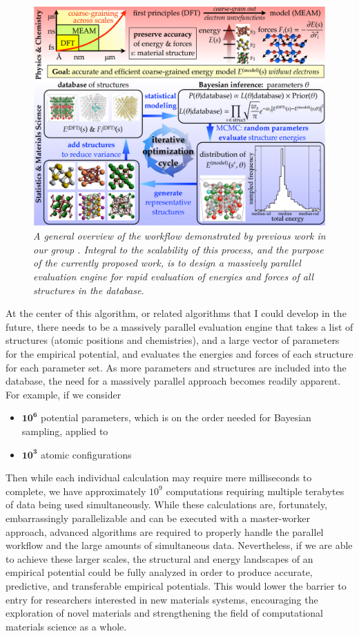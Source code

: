 \documentclass[11pt]{article}
\begin{document}
\begin{figure}
  \centering
  \includegraphics[width=0.65\linewidth]{workflow.png}
  \caption{\textit{A general overview of the workflow demonstrated by previous work in our group \cite{dbopt}. Integral to the scalability of this process, and the purpose of the currently proposed work, is to design a massively parallel evaluation engine for rapid evaluation of energies and forces of all structures in the database.}}
  \label{fig:workflow}
\end{figure}

At the center of this algorithm, or related algorithms that I could develop in the future, there needs to be a massively parallel evaluation engine that takes a list of structures (atomic positions and chemistries), and a large vector of parameters for the empirical potential, and evaluates the energies and forces of each structure for each parameter set. As more parameters and structures are included into the database, the need for a massively parallel approach becomes readily apparent. For example, if we consider

\begin{itemize}
    \item $\mathbf{10^6}$ potential parameters, which is on the order needed for Bayesian sampling, applied to
    \item $\mathbf{10^3}$ atomic configurations
\end{itemize}

\noindent Then while each individual calculation may require mere milliseconds to complete, we have approximately $10^9$ computations requiring multiple terabytes of data being used simultaneously. While these calculations are, fortunately, embarrassingly parallelizable and can be executed with a master-worker approach, advanced algorithms are required to properly handle the parallel workflow and the large amounts of simultaneous data. Nevertheless, if we are able to achieve these larger scales, the structural and energy landscapes of an empirical potential could be fully analyzed in order to produce accurate, predictive, and transferable empirical potentials. This would lower the barrier to entry for researchers interested in new materials systems, encouraging the exploration of novel materials and strengthening the field of computational materials science as a whole.
\end{document}
